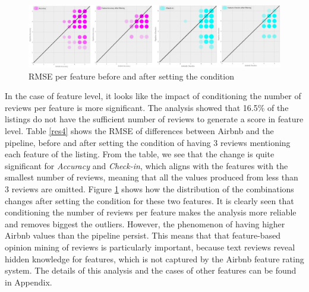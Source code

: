 \begin{figure}[h!]
\centering
	\includegraphics[height=0.21\textheight]{accuracy_checkin}
	\caption{RMSE per feature before and after setting the condition}
	\label{fig:6.6}
\end{figure}
In the case of feature level, it looks like the impact of conditioning the number of reviews per feature is more significant. The analysis showed that 16.5\%  of the listings do not have the sufficient number of reviews to generate a score in feature level. Table \ref{res4} shows the RMSE of differences between Airbnb and the pipeline, before and after setting the condition of having 3 reviews mentioning each feature of the listing. From the table, we see that the change is quite significant for \textit{Accuracy} and \textit{Check-in}, which aligns with the features with the smallest number of reviews, meaning that all the values produced from less than 3 reviews are omitted. Figure \ref{fig:6.6} shows how the distribution of the combinations changes after setting the condition for these two features. It is clearly seen that conditioning the number of reviews per feature makes the analysis more reliable and removes biggest the outliers. However, the phenomenon of having higher Airbnb values than the pipeline persist. This means that that feature-based opinion mining of reviews is particularly important, because  text reviews reveal hidden knowledge for features, which is not captured by the Airbnb feature rating system. The details of this analysis and the cases of other features can be found in Appendix. 
%
%
%
